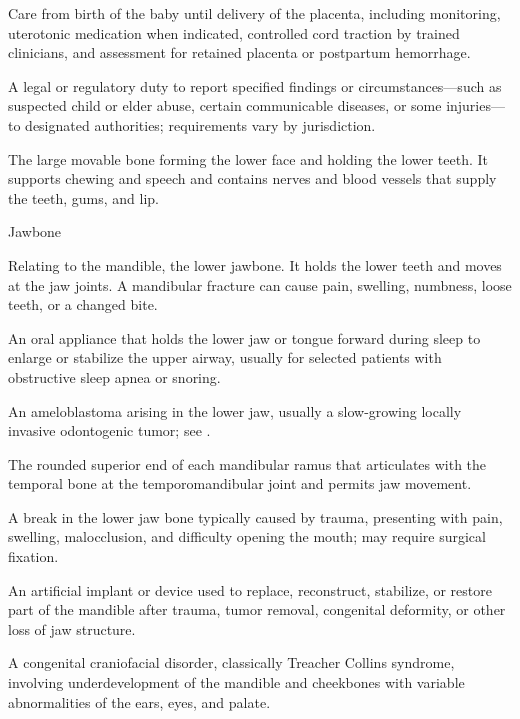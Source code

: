  Care from birth of the baby until delivery of the placenta, including monitoring, uterotonic medication when indicated, controlled cord traction by trained clinicians, and assessment for retained placenta or postpartum hemorrhage.

 A legal or regulatory duty to report specified findings or circumstances—such as suspected child or elder abuse, certain communicable diseases, or some injuries—to designated authorities; requirements vary by jurisdiction.

 The large movable bone forming the lower face and holding the lower teeth. It supports chewing and speech and contains nerves and blood vessels that supply the teeth, gums, and lip.

\synonyms
Jawbone

 Relating to the mandible, the lower jawbone. It holds the lower teeth and moves at the jaw joints. A mandibular fracture can cause pain, swelling, numbness, loose teeth, or a changed bite.

 An oral appliance that holds the lower jaw or tongue forward during sleep to enlarge or stabilize the upper airway, usually for selected patients with obstructive sleep apnea or snoring.

 An ameloblastoma arising in the lower jaw, usually a slow-growing locally invasive odontogenic tumor; see .

 The rounded superior end of each mandibular ramus that articulates with the temporal bone at the temporomandibular joint and permits jaw movement.

 A break in the lower jaw bone typically caused by trauma, presenting with pain,
swelling, malocclusion, and difficulty opening the mouth; may require surgical fixation.

 An artificial implant or device used to replace, reconstruct, stabilize, or restore part of the mandible after trauma, tumor removal, congenital deformity, or other loss of jaw structure.

 A congenital craniofacial disorder, classically Treacher Collins syndrome, involving underdevelopment of the mandible and cheekbones with variable abnormalities of the ears, eyes, and palate.

